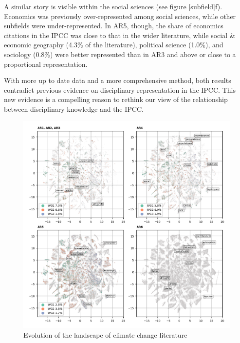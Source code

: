 \documentclass{article}
\begin{document}
\begin{linenumbers}
A similar story is visible within the social sciences (see figure \ref{subfield}f). 
Economics was previously over-represented among social sciences, while other subfields were under-represented.
In AR5, though, the share of economics citations in the IPCC was close to that in the wider literature, while social \& economic geography (4.3\% of the literature), political science (1.0\%), and sociology (0.8\%) were better represented than in AR3 and above or close to a proportional representation. 

With more up to date data and a more comprehensive method, both results contradict previous evidence on disciplinary representation in the IPCC. This new evidence is a compelling reason to rethink our view of the relationship between disciplinary knowledge and the IPCC. %


\begin{figure}
	\begin{center}
		\includegraphics[width=180mm]{tsne_results/plots/run_1861_s_0_p100_evolution_4.png}
		\caption{Evolution of the landscape of climate change literature}
		\label{evolution-map}
	\end{center}
\end{figure}


\end{linenumbers}
\end{document}
